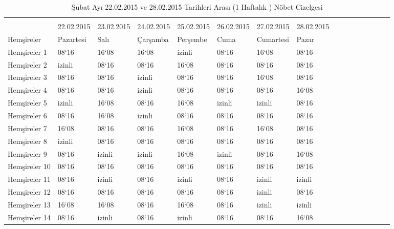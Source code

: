 \documentclass[12pt, a4paper]{article}
\begin{document}
\begin{flushleft}
\begin{center}
\begin{landscape}
\begin{table}
		\end{table}
		
		
		\begin{table}
			\caption{Şubat Ayı 22.02.2015 ve 28.02.2015 Tarihleri Arası (1 Haftalık ) Nöbet Cizelgesi}
			\begin{tabular}{|p{3cm}||p{2cm}||p{2cm}||p{3cm}||p{3cm}||p{3cm}||p{3cm}|p{2cm}|c|c|c|c|c|c|c|c|}
				\rowcolor{red}
				
				\hline \multicolumn{8}{|c|}{Şubat Ayı Hafta - 4} \\
				\rowcolor{yellow}
				\hline  & 22.02.2015 & 23.02.2015 & 24.02.2015 & 25.02.2015&26.02.2015&27.02.2015& 28.02.2015 \\
				\rowcolor{lightgray}
				
				\hline Hemşireler   & Pazartesi& Salı & Çarşamba & Perşembe &Cuma&Cumartesi &Pazar\\
				\hline Hemşireler 1 &  08`16 &  16`08 &  16`08 & izinli&  08`16 & 16`08 & 08`16 \\
				\hline Hemşireler 2 &  izinli&  08`16 &  08`16 & 16`08 &  08`16 & 08`16 & 08`16 \\
				\hline Hemşireler 3 &  08`16 &  08`16 &  izinli& 08`16 &  08`16 & 16`08 & 08`16 \\
				\hline Hemşireler 4 &  08`16 &  08`16 &  izinli& 08`16 &  08`16 & 08`16 & 16`08 \\
				\hline Hemşireler 5 &  izinli&  16`08 &  08`16 & 16`08 &  izinli& izinli& 08`16 \\
				\hline Hemşireler 6 &  08`16 &  16`08 &  izinli& 08`16 &  08`16 & 08`16 & 08`16 \\
				\hline Hemşireler 7 &  16`08 &  08`16 &  08`16 & 16`08 &  08`16 & 16`08 & 08`16 \\
				\hline Hemşireler 8 &  izinli&  08`16 &  08`16 & 08`16 &  08`16 & 08`16 & 08`16 \\
				\hline Hemşireler 9 &  08`16 &  izinli&  izinli& 16`08 &  izinli& 08`16 & 16`08 \\
				\hline Hemşireler 10 & 08`16 &  08`16 &  08`16 & 08`16 &  08`16 & 08`16 & 08`16  \\
				\hline Hemşireler 11 & 08`16 &  izinli&  08`16 & izinli&  08`16 & izinli& izinli \\
				\hline Hemşireler 12 & 08`16 &  08`16 &  08`16 & 08`16 &  08`16 & izinli& 08`16  \\
				\hline Hemşireler 13 & 16`08 &  16`08 &  08`16 & 16`08 &  08`16 & izinli& izinli \\
				\hline Hemşireler 14 & 08`16 &  izinli&  08`16 & izinli&  08`16 & 08`16 & 16`08  \\
				\hline
			\end{tabular}
			

\end{table}
\end{landscape}
\end{center}
\end{flushleft}
\end{document}
